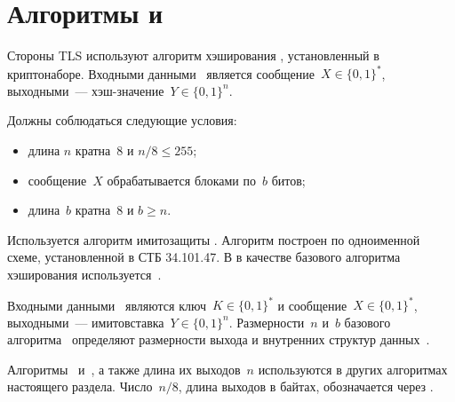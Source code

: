 ﻿\section{Алгоритмы  и }\label{CRYPTO.Hash}

Стороны TLS используют алгоритм хэширования , установленный в криптонаборе.
%
Входными данными~ является сообщение~$X\in\{0,1\}^*$, выходными~--- 
хэш-значение~$Y\in\{0,1\}^n$. 

Должны соблюдаться следующие условия:
\begin{itemize}
\item
длина $n$ кратна~$8$ и $n/8\leq 255$;
\item
сообщение~$X$ обрабатывается блоками по~$b$ битов;
\item
длина~$b$ кратна~$8$ и $b\geq n$.
\end{itemize}

Используется алгоритм имитозащиты . Алгоритм построен 
по одноименной схеме, установленной в СТБ 34.101.47. В  в качестве 
базового алгоритма хэширования используется~.

Входными данными~ являются ключ~$K\in\{0,1\}^*$ и 
сообщение~$X\in\{0,1\}^*$, выходными~--- имитовставка~$Y\in\{0,1\}^n$.
%
Размерности~$n$ и~$b$ базового алгоритма~ определяют размерности выхода 
и внутренних структур данных~.

Алгоритмы~ и~, а также  длина их выходов~$n$ используются 
в других алгоритмах настоящего раздела. Число~$n/8$, длина выходов в байтах, 
обозначается через .


